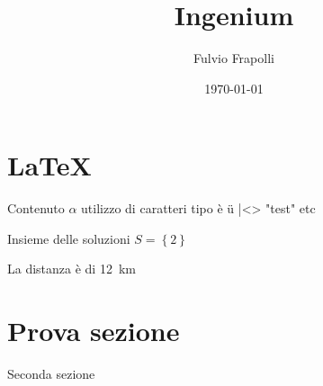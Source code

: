 \documentclass[]{article}
\title{Ingenium}
\author{Fulvio Frapolli}
\date{\today}
\begin{document}
\maketitle

\tableofcontents
\newpage



\section{\LaTeX}

Contenuto $\alpha$ utilizzo di caratteri tipo è ü |<> "test"
 etc



 Insieme delle soluzioni $S=\left\lbrace 2 \right\rbrace$

 La distanza è di \qty{12}{\km}    

\section{Prova sezione}

Seconda sezione
\end{document}
